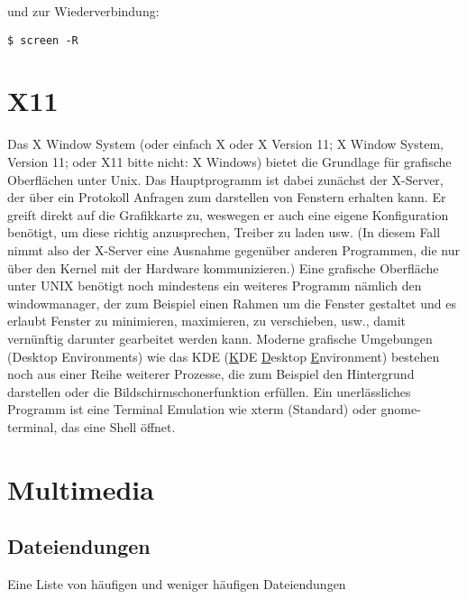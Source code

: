 \documentclass[titlepage,a4paper]{article}
\begin{document}
\noindent
und zur Wiederverbindung:

\begin{verbatim}
$ screen -R
\end{verbatim}

\section{X11}
\label{sec:x11}

Das X Window System (oder einfach X oder X Version 11; X Window System,
Version 11; oder X11 bitte nicht: X Windows) bietet die Grundlage für
grafische Oberflächen unter Unix.  Das Hauptprogramm ist dabei zunächst der
X-Server, der über ein Protokoll Anfragen zum darstellen von Fenstern erhalten
kann.  Er greift direkt auf die Grafikkarte zu, weswegen er auch eine
eigene Konfiguration benötigt, um diese richtig anzusprechen, Treiber zu laden
usw.  (In diesem Fall nimmt also der X-Server eine Ausnahme gegenüber anderen
Programmen, die nur über den Kernel mit der Hardware kommunizieren.)  Eine
grafische Oberfläche unter UNIX benötigt noch mindestens ein weiteres Programm
nämlich den windowmanager, der zum Beispiel einen Rahmen um die Fenster
gestaltet und es erlaubt Fenster zu minimieren, maximieren, zu verschieben,
usw., damit vernünftig darunter gearbeitet werden kann.  Moderne grafische
Umgebungen (Desktop Environments) wie das KDE (\underline{K}DE
\underline{D}esktop \underline{E}nvironment) bestehen noch aus einer Reihe
weiterer Prozesse, die zum Beispiel den Hintergrund darstellen oder die
Bildschirmschonerfunktion erfüllen.  Ein unerlässliches Programm ist eine
Terminal Emulation wie xterm (Standard) oder gnome-terminal,
das eine Shell öffnet.

\section{Multimedia}

\subsection{Dateiendungen}

Eine Liste von häufigen und weniger häufigen Dateiendungen
\end{document}
